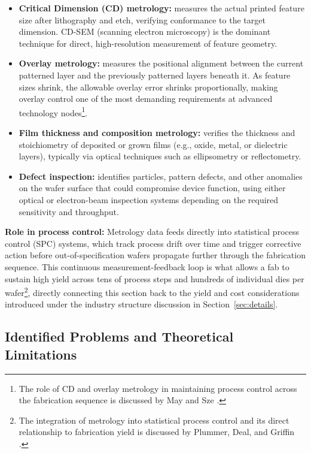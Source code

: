 \documentclass[10pt,a4paper]{article}
\begin{document}
\begin{itemize}
    \item \textbf{Critical Dimension (CD) metrology:} measures the actual 
    printed feature size after lithography and etch, verifying conformance to 
    the target dimension. CD-SEM (scanning electron microscopy) is the 
    dominant technique for direct, high-resolution measurement of feature 
    geometry.
    \item \textbf{Overlay metrology:} measures the positional alignment between 
    the current patterned layer and the previously patterned layers beneath it. 
    As feature sizes shrink, the allowable overlay error shrinks proportionally, 
    making overlay control one of the most demanding requirements at advanced 
    technology nodes\footnote{The role of CD and overlay metrology in 
    maintaining process control across the fabrication sequence is discussed by 
    May and Sze \cite{maysze2004}.}.
    \item \textbf{Film thickness and composition metrology:} verifies the 
    thickness and stoichiometry of deposited or grown films (e.g., oxide, 
    metal, or dielectric layers), typically via optical techniques such as 
    ellipsometry or reflectometry.
    \item \textbf{Defect inspection:} identifies particles, pattern defects, 
    and other anomalies on the wafer surface that could compromise device 
    function, using either optical or electron-beam inspection systems 
    depending on the required sensitivity and throughput.
\end{itemize}

\textbf{Role in process control:} Metrology data feeds directly into 
statistical process control (SPC) systems, which track process drift over 
time and trigger corrective action before out-of-specification wafers 
propagate further through the fabrication sequence. This continuous 
measurement-feedback loop is what allows a fab to sustain high yield across 
tens of process steps and hundreds of individual dies per 
wafer\footnote{The integration of metrology into statistical process control 
and its direct relationship to fabrication yield is discussed by Plummer, 
Deal, and Griffin \cite{plummer2000}.}, directly connecting this section back 
to the yield and cost considerations introduced under the industry structure 
discussion in Section~\ref{sec:details}.

\subsection{Identified Problems and Theoretical Limitations}
\end{document}
